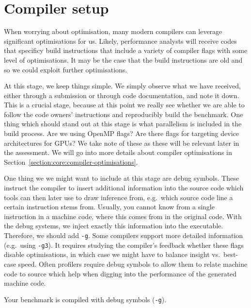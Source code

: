 \section{Compiler setup}
\label{section:preparation:compiler-settings}

When worrying about optimisation, many modern compilers can leverage significant optimisations for us. Likely, performance analysts will receive codes that specificy build instructions that include a variety of compiler flags with some level of optimisations. It may be the case that the build instructions are old and so we could exploit further optimisations.

At this stage, we keep things simple. We simply observe what we have received, either through a submission or through code documentation, and note it down. This is a crucial stage, because at this point we really see whether we are able to follow the code owners' instructions and reproducibly build the benchmark. One thing which should stand out at this stage is what parallelism is included in the build process. Are we using OpenMP flags? Are there flags for targeting device architectures for GPUs? We take note of these as these will be relevant later in the assessment.
We will go into more details about compiler optimisations in Section~\ref{section:core:compiler-optimisations}. 

One thing we we might want to include at this stage are debug symbols.
These instruct the compiler to insert additional information into the source
code which tools can then later use to draw inference
from, e.g.~which source code line a certain instruction stems from.
Usually, you cannot know from a single instruction in a machine code, where this
comes from in the original code.
With the debug systems, we inject exactly this information into the executable.
Therefore, we should add \texttt{-g}.
Some compilers support more detailed information (e.g.~using \texttt{-g3}).
It requires studying the compiler's feedback whether these flags disable
optimisations, in which case we might have to balance insight vs.~best-case
speed. Often profilers require debug symbols to allow them to relate machine code to source which help when digging into the performance of the generated machine code.

\begin{checklist}
 \item Your benchmark is compiled with debug symbols (\texttt{-g}).
\end{checklist}


